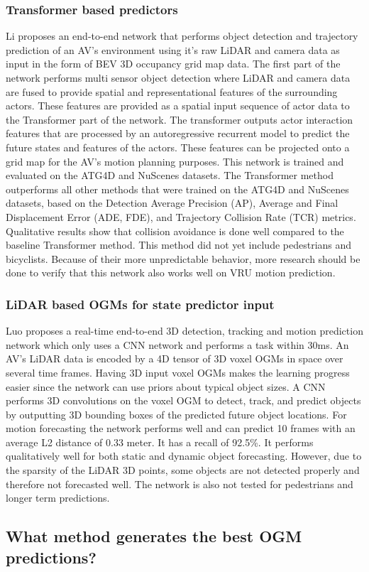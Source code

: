 \subsubsection{Transformer based predictors}
Li \cite{li2020end} proposes an end-to-end network that performs object detection and trajectory prediction of an AV's environment using it's raw LiDAR and camera data as input in the form of BEV 3D occupancy grid map data. The first part of the network performs multi sensor object detection where LiDAR and camera data are fused to provide spatial and representational features of the surrounding actors. These features are provided as a spatial input sequence of actor data to the Transformer part of the network. The transformer outputs actor interaction features that are processed by an autoregressive recurrent model to predict the future states and features of the actors. These features can be projected onto a grid map for the AV's motion planning purposes. This network is trained and evaluated on the ATG4D \cite{luo2018fast} and NuScenes \cite{caesar2020nuscenes} datasets. The Transformer method outperforms all other methods that were trained on the ATG4D and NuScenes datasets, based on the Detection Average Precision (AP), Average and Final Displacement Error (ADE, FDE), and Trajectory Collision Rate (TCR) metrics. Qualitative results show that collision avoidance is done well compared to the baseline Transformer method. This method did not yet include pedestrians and bicyclists. Because of their more unpredictable behavior, more research should be done to verify that this network also works well on VRU motion prediction.

\subsubsection{LiDAR based OGMs for state predictor input}
Luo \cite{luo2018fast} proposes a real-time end-to-end 3D detection, tracking and motion prediction network which only uses a CNN network and performs a task within 30ms. An AV's LiDAR data is encoded by a 4D tensor of 3D voxel OGMs in space over several time frames. Having 3D input voxel OGMs makes the learning progress easier since the network can use priors about typical object sizes. A CNN performs 3D convolutions on the voxel OGM to detect, track, and predict objects by outputting 3D bounding boxes of the predicted future object locations. For motion forecasting the network performs well and can predict 10 frames with an average L2 distance of 0.33 meter. It has a recall of 92.5\%. It performs qualitatively well for both static and dynamic object forecasting. However, due to the sparsity of the LiDAR 3D points, some objects are not detected properly and therefore not forecasted well. The network is also not tested for pedestrians and longer term predictions.




\subsection{What method generates the best OGM predictions?}